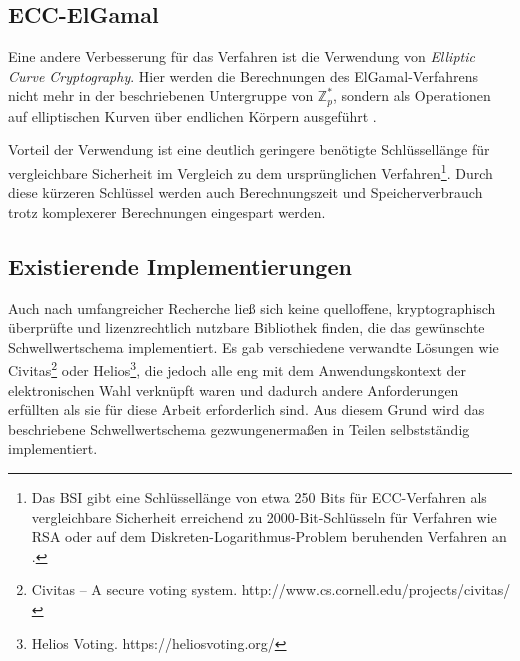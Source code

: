 \subsection{ECC-ElGamal}

\label{sec_state_threshold_ecc}

Eine andere Verbesserung für das Verfahren ist die Verwendung von \textit{Elliptic Curve Cryptography}. Hier werden die Berechnungen des ElGamal-Verfahrens nicht mehr in der beschriebenen Untergruppe von \(\mathbb{Z}_p^*\), sondern als Operationen auf elliptischen Kurven über endlichen Körpern ausgeführt \cite{koblitz1987elliptic}.

Vorteil der Verwendung ist eine deutlich geringere benötigte Schlüssellänge für vergleichbare Sicherheit im Vergleich zu dem ursprünglichen Verfahren\footnote{
  Das BSI gibt eine Schlüssellänge von etwa 250 Bits für ECC-Verfahren als vergleichbare Sicherheit erreichend zu 2000-Bit-Schlüsseln für Verfahren wie RSA oder auf dem Diskreten-Logarithmus-Problem beruhenden Verfahren an \cite{bsi2018}.
}. Durch diese kürzeren Schlüssel werden auch Berechnungszeit und Speicherverbrauch trotz komplexerer Berechnungen eingespart werden.

\subsection{Existierende Implementierungen}

\label{sec_state_threshold_existing_impl}

Auch nach umfangreicher Recherche ließ sich keine quelloffene, kryptographisch überprüfte und lizenzrechtlich nutzbare Bibliothek finden, die das gewünschte Schwellwertschema implementiert. Es gab verschiedene verwandte Lösungen wie Civitas\footnote{
  Civitas -- A secure voting system. http://www.cs.cornell.edu/projects/civitas/
} oder Helios\footnote{
  Helios Voting. https://heliosvoting.org/
}, die jedoch alle eng mit dem Anwendungskontext der elektronischen Wahl verknüpft waren und dadurch andere Anforderungen erfüllten als sie für diese Arbeit erforderlich sind. Aus diesem Grund wird das beschriebene Schwellwertschema gezwungenermaßen in Teilen selbstständig implementiert.